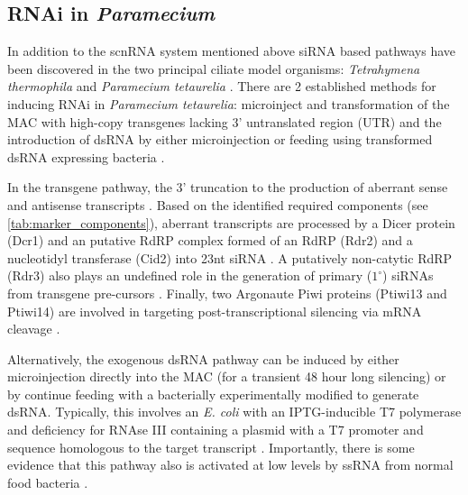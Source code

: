 \subsection{RNAi in \textit{Paramecium}}

In addition to the scnRNA system mentioned above siRNA
based pathways have been discovered in the two principal
ciliate model organisms: \textit{Tetrahymena thermophila} \citep{Collins2006,Yao2005}
and \textit{Paramecium tetaurelia} \citep{Galvani2001,Galvani2002}. 
There are 2 established methods for inducing RNAi in \textit{Paramecium tetaurelia}:
microinject and transformation of the MAC with high-copy transgenes lacking 3' untranslated
region (UTR) \citep{Galvani2001} and the introduction of dsRNA by either
microinjection or feeding using transformed dsRNA expressing bacteria 
\citep{Galvani2002}.

In the transgene pathway, the 3' truncation to the production of aberrant
sense and antisense transcripts \citep{Galvani2001,Marker2010,Beisson2010b}.
Based on the identified required components (see \cref{tab:marker_components}), 
aberrant transcripts
are processed by a Dicer protein (Dcr1) \citep{Lepere2009} and
an putative RdRP complex formed of an RdRP (Rdr2) and a nucleotidyl
transferase (Cid2) \citep{Marker2014} into 23nt siRNA \citep{Lepere2009}. 
A putatively non-catytic 
RdRP (Rdr3) also plays an undefined role in the generation
of primary (\(1^{\circ}\)) siRNAs from transgene pre-cursors \citep{Marker2010,Marker2014}.
Finally, two Argonaute Piwi proteins (Ptiwi13 and Ptiwi14) \citep{Bouhouche2011} 
are involved in targeting post-transcriptional silencing via mRNA
cleavage \citep{Bouhouche2011,Marker2014}.


Alternatively, the exogenous dsRNA pathway can be induced by either microinjection directly
into the MAC (for a transient 48 hour long silencing) or by continue feeding
with a bacterially experimentally modified to generate dsRNA.
Typically, this involves an \textit{E. coli} 
with an IPTG-inducible T7 polymerase and 
deficiency for RNAse III containing a plasmid with a T7 promoter and sequence
homologous to the target transcript
\citep{Fire1998,Timmons2001,Galvani2002}.
Importantly, there is some evidence that this pathway also is activated at low
levels by ssRNA from normal food bacteria \citep{Carradec2015}.

